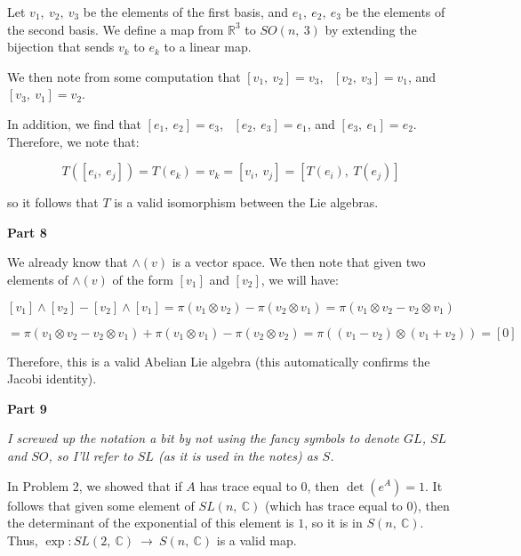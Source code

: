 \documentclass[10pt, oneside]{article}
\begin{document}
    Let $v_1, \ v_2, \ v_3$ be the elements of the first basis, and $e_1, \ e_2, \ e_3$ be the elements of the second basis. We define a map from $\mathbb{R}^3$ to $SO(n, \ 3)$ by extending the bijection
    that sends $v_k$ to $e_k$ to a linear map.
    \newline

    We then note from some computation that $[v_1, \ v_2] = v_3$, \ $[v_2, \ v_3] = v_1$, and $[v_3, \ v_1] = v_2$.
    \newline

    In addition, we find that $[e_1, \ e_2] = e_3$, \ $[e_2, \ e_3] = e_1$, and $[e_3, \ e_1] = e_2$. Therefore, we note that:

    $$T([e_{i}, \ e_{j}]) = T(e_k) = v_k = [v_{i}, \ v_{j}] = [T(e_i), \ T(e_j)]$$

    so it follows that $T$ is a valid isomorphism between the Lie algebras.
    \newline

    \textbf{Part 8}
    \newline

    We already know that $\wedge(v)$ is a vector space. We then note that given two elements of $\wedge(v)$ of the form $[v_1]$ and $[v_2]$, we will have:

    $$[v_1] \wedge [v_2] - [v_2] \wedge [v_1] = \pi(v_1 \otimes v_2) - \pi(v_2 \otimes v_1) = \pi(v_1 \otimes v_2 - v_2 \otimes v_1)$$

    $$ = \pi(v_1 \otimes v_2 - v_2 \otimes v_1) + \pi(v_1 \otimes v_1) - \pi(v_2 \otimes v_2) = \pi((v_1 - v_2) \otimes (v_1 + v_2)) = [0]$$

    Therefore, this is a valid Abelian Lie algebra (this automatically confirms the Jacobi identity).
    \newline

    \textbf{Part 9}
    \newline

    \textit{I screwed up the notation a bit by not using the fancy symbols to denote $GL$, $SL$ and $SO$, so I'll refer to $SL$ (as it is used in the notes) as $S$.}
    \newline

    In Problem 2, we showed that if $A$ has trace equal to $0$, then $\det(e^A) = 1$. It follows that given some element of $SL(n, \ \mathbb{C})$ (which has trace equal to $0$), then
    the determinant of the exponential of this element is $1$, so it is in $S(n, \ \mathbb{C})$. Thus, $\exp : SL(2, \ \mathbb{C}) \ \rightarrow \ S(n, \ \mathbb{C})$ is a valid map.
    \newline
\end{document}
